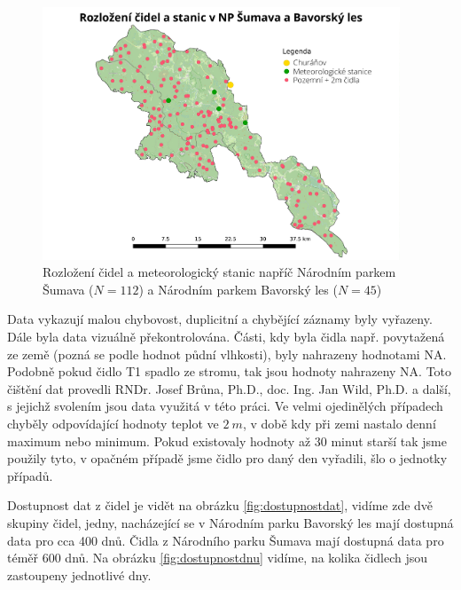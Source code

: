 \begin{figure}
	\centering
	\includegraphics[width=0.95\textwidth]{img/rozlozenicidel.pdf}
	\caption{Rozložení čidel a meteorologický stanic napříč Národním parkem Šumava ($N=112$) a Národním parkem Bavorský les ($N=45$)}
	\label{fig:rozlozenicidel}
\end{figure}

Data vykazují malou chybovost, duplicitní a chybějící záznamy byly vyřazeny. Dále byla data vizuálně překontrolována. Části, kdy byla čidla např. povytažená ze země (pozná se podle hodnot půdní vlhkosti), byly nahrazeny hodnotami NA. Podobně pokud čidlo T1 spadlo ze stromu, tak jsou hodnoty nahrazeny NA. Toto čištění dat provedli RNDr. Josef Brůna, Ph.D., doc. Ing. Jan Wild, Ph.D. a další, s jejichž svolením jsou data využitá v této práci. Ve velmi ojedinělých případech chyběly odpovídající hodnoty teplot ve $\SI{2}{m}$, v době kdy při zemi nastalo denní maximum nebo minimum. Pokud existovaly hodnoty až 30 minut starší tak jsme použily tyto, v opačném případě jsme čidlo pro daný den vyřadili, šlo o jednotky případů.

Dostupnost dat z čidel je vidět na obrázku \ref{fig:dostupnostdat}, vidíme zde dvě skupiny čidel, jedny, nacházející se v Národním parku Bavorský les mají dostupná data pro cca 400 dnů. Čidla z Národního parku Šumava mají dostupná data pro téměř 600 dnů. Na obrázku \ref{fig:dostupnostdnu} vidíme, na kolika čidlech jsou zastoupeny jednotlivé dny.

